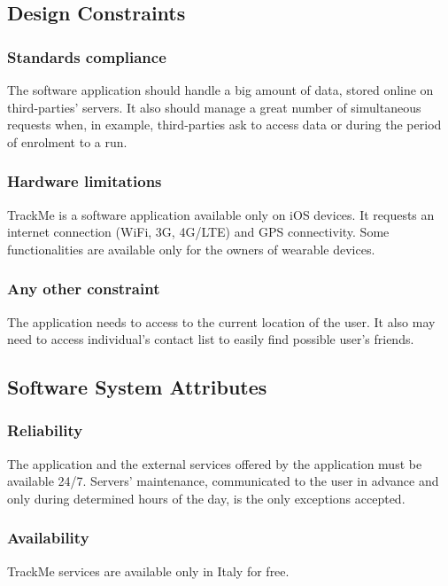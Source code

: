 \documentclass{article}
\begin{document}
\subsection{Design Constraints}

	\subsubsection{Standards compliance}
	The software application should handle a big amount of data, 
	stored online on third-parties' servers. 
	It also should manage a great number of simultaneous requests 
	when, in example, third-parties ask to access data or during the
	period of enrolment to a run.
	
	\subsubsection{Hardware limitations}
	TrackMe is a software application available only on iOS devices. 
	It requests an internet connection (WiFi, 3G, 4G/LTE) and 
	GPS connectivity. \newline
	Some functionalities are available only for the owners of 
	wearable devices. 

	\subsubsection{Any other constraint}
	The application needs to access to the current location of the 
	user. It also may need to access individual's contact list to
	easily find possible user's friends. 
	
\newpage
\subsection{Software System Attributes}	

	\subsubsection{Reliability}
	The application and the external services offered by the
	application must be available 24/7. \newline
	Servers' maintenance, communicated to the user in advance
	and only during determined hours of the day, is the only 
	exceptions accepted. 
	
	\subsubsection{Availability}
	TrackMe services are available only in Italy for free.
	
\end{document}
